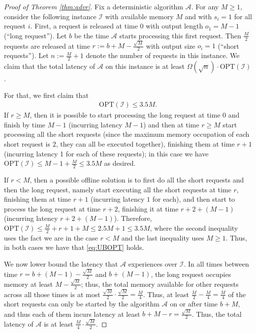 \documentclass[11pt, a4paper]{article}
\theoremstyle{plain}
\theoremstyle{definition}
\theoremstyle{remark}
\newcommand{\cA}{\mathcal{A}}
\newcommand{\cI}{\mathcal{I}}
\newcommand{\OPT}{\text{OPT}}
\begin{document}
\begin{proof}[Proof of Theorem \ref{thm:advr}]
    Fix a deterministic algorithm $\cA$. For any $M \ge 1$, consider the following instance $\cI$ with available memory $M$ and with $s_i=1$ for all request $i$. First, a request is released at time 0 with output length $o_1 = M-1$ (``long request''). Let $b$ be the time $\cA$ starts processing this first request. Then $\frac{M}{2}$ requests are released at time $r := b + M - \frac{\sqrt{M}}{2}$ with output size $o_i = 1$ (``short requests''). Let $n := \frac{M}{2} + 1$ denote the number of requests in this instance. We claim that the total latency of $\cA$ on this instance is at least $\Omega(\sqrt{n}) \cdot \OPT(\cI)$. 
    
    For that, we first claim that 
    \begin{align}
    \OPT(\cI) \le 3.5M. \label{eq:UBOPT}
    \end{align}
   If $r \ge M$, then it is possible to start processing the long request at time 0 and finish by time $M-1$ (incurring latency $M-1$) and then at time $r \ge M$ start processing all the short requests (since the maximum memory occupation of each short request is 2, they can all be executed together), finishing them at time $r + 1$ (incurring latency 1 for each of these requests); in this case we have $\OPT(\cI) \le M-1 + \frac{M}{2} \le 3.5M$ as desired.
   
    
    If $r < M$, then a possible offline solution is to first do all the short requests and then the long request, namely start executing all the short requests at time $r$, finishing them at time $r + 1$ (incurring latency $1$ for each), and then start to process the long request at time $r + 2$, finishing it at time $r + 2 + (M-1)$ (incurring latency $r + 2 + (M-1)$). Therefore, $\OPT(\cI) \le \frac{M}{2} + r + 1 + M \le 2.5 M + 1 \le 3.5 M$, where the second inequality uses the fact we are in the case $r < M$ and the last inequality uses $M \ge 1$. Thus, in both cases we have that \eqref{eq:UBOPT} holds.  

    We now lower bound the latency that $\cA$ experiences over $\cI$. In all times between time $r = b + (M-1) - \frac{\sqrt{M}}{2}$ and $b + (M-1)$, the long request occupies memory at least $M - \frac{\sqrt{M}}{2}$; thus, the total memory available for other requests across all those times is at most $\frac{\sqrt{M}}{2} \cdot \frac{\sqrt{M}}{2} = \frac{M}{4}$. Thus, at least $\frac{M}{2} - \frac{M}{4} = \frac{M}{4}$ of the short requests can only be started by the algorithm $\cA$ on or after time $b + M$, and thus each of them incurs latency at least $b + M - r = \frac{\sqrt{M}}{2}$. Thus, the total latency of $\cA$ is at least $\frac{M}{4} \cdot \frac{\sqrt{M}}{2}$. 
    

\end{proof}
\end{document}
